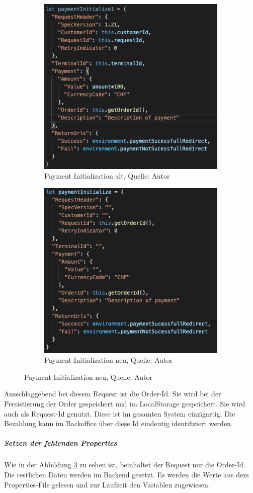 \begin{figure}[H]
	\begin{subfigure}[b]{0.5\textwidth}
		\includegraphics[scale=0.5]{images/paymentOld.PNG}
		\caption[Payment Initialization alt]{Payment Initialization alt, Quelle: Autor}
		\label{img: requestOld}
	\end{subfigure}
	\hfill
	\begin{subfigure}[b]{0.5\textwidth}
		\includegraphics[scale=0.5]{images/paymentNew.PNG}
		\caption[Payment Initialization neu]{Payment Initialization neu, Quelle: Autor}
		\label{img: requestNew}
	\end{subfigure}
\end{figure} 
Ausschlaggebend bei diesem Request ist die Order-Id. Sie wird bei der Persistierung der Order gespeichert und im \gls{LocalStorage} gespeichert. Sie wird auch als Request-Id genutzt. Diese ist im gesamten System einzigartig. Die Bezahlung kann im Backoffice über diese Id eindeutig identifiziert werden. \\
\subparagraph{Setzen der fehlenden Properties}
Wie in der Abbildung \ref{img: requestNew} zu sehen ist, beinhaltet der Request nur die Order-Id. Die restlichen Daten werden im Backend gesetzt. Es werden die Werte aus dem Properties-File gelesen und zur Laufzeit den Variablen zugewiesen. 

